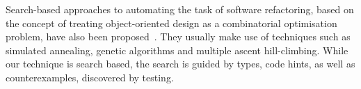 \documentclass[conference]{IEEEtran}
\begin{document}
Search-based approaches to automating the task of software refactoring,
based on the concept of treating object-oriented design as a combinatorial
optimisation problem, have also been proposed~\cite{search1,search2}.  They
usually make use of techniques such as simulated annealing, genetic
algorithms and multiple ascent hill-climbing.
%
%
While our technique is search based, the search is guided by types, code
hints, as well as counterexamples, discovered by testing.
\end{document}
